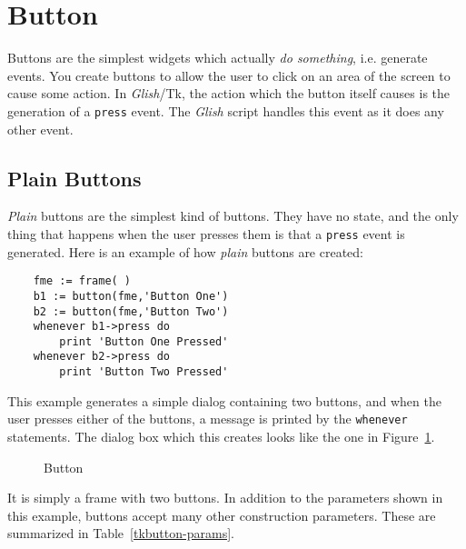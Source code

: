 \section{Button}
Buttons are the simplest widgets which actually {\em do something}, i.e. generate
events. You create buttons to allow the user to click on an area of the
screen to cause some action. In {\em Glish}/Tk, the
action which the
button itself causes is the generation of a {\tt press} event. The
{\em Glish}
script handles this event as it does any other event.

\subsection{Plain Buttons}
{\em Plain} buttons are the simplest kind of buttons. They have no
state, and the only
thing that happens when the user presses them is that a {\tt press} event is
generated. Here is an example of how {\em plain} buttons are created:
\begin{verbatim}
    fme := frame( )
    b1 := button(fme,'Button One')
    b2 := button(fme,'Button Two')
    whenever b1->press do
        print 'Button One Pressed'
    whenever b2->press do
        print 'Button Two Pressed'
\end{verbatim}
This example generates a simple dialog containing two buttons, 
and when the user
presses either of the buttons, a message is printed by the {\tt whenever}
statements. The dialog box which this creates looks like the one in
Figure~\ref{tkbutton}.
\begin{figure}[thb]
\centerline{}
\caption{ Button }
\label{tkbutton}
\end{figure}
It is simply a frame with two buttons. In addition to the parameters shown in
this example, buttons accept many other construction parameters. These are summarized
in Table~\ref{tkbutton-params}.

